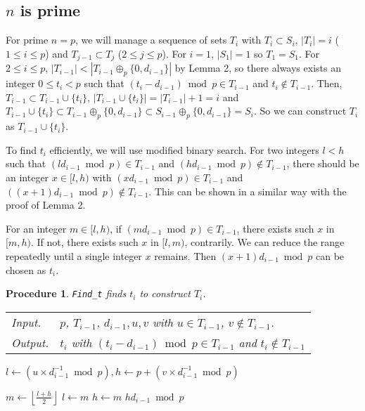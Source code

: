 \documentclass[11pt]{article}
\newtheorem{procedure}{Procedure}
\begin{document}
\subsection{$n$ is prime}

For prime $n = p$, we will manage a sequence of sets $T_i$ with $T_i \subset S_i$, $|T_i| = i$ ($1 \le i \le p$) and $T_{j-1} \subset T_j$ ($2 \le j \le p$). For $i=1$, $|S_1|=1$ so $T_1=S_1$. For $2 \le i \le p$, $|T_{i-1}| < |T_{i-1} \oplus_p \{0, d_{i-1}\}|$ by Lemma 2, so there always exists an integer $0 \le t_i < p$ such that $(t_i - d_{i-1}) \bmod p \in T_{i-1}$ and $t_i \not \in T_{i-1}$. Then, $T_{i-1} \subset T_{i-1} \cup \{t_i\}$, $|T_{i-1} \cup \{t_i\}|=|T_{i-1}|+1=i$ and $T_{i-1} \cup \{t_i\} \subset T_{i-1} \oplus_p \{0, d_{i-1}\} \subset S_{i-1} \oplus_p \{0, d_{i-1}\} = S_i$. So we can construct $T_i$ as $T_{i-1} \cup \{t_i\}$.

To find $t_i$ efficiently, we will use modified binary search. For two integers $l < h$ such that $(ld_{i-1} \bmod p) \in T_{i-1}$ and $(hd_{i-1} \bmod p) \not \in T_{i-1}$, there should be an integer $x \in [l, h)$ with $(xd_{i-1} \bmod p) \in T_{i-1}$ and $((x+1)d_{i-1} \bmod p) \not \in T_{i-1}$. This can be shown in a similar way with the proof of Lemma 2.

For an integer $m \in [l, h)$, if $(md_{i-1} \bmod p) \in T_{i-1}$, there exists such $x$ in $[m, h)$. If not, there exists such $x$ in $[l, m)$, contrarily. We can reduce the range repeatedly until a single integer $x$ remains. Then $(x+1)d_{i-1} \bmod p$ can be chosen as $t_i$.



\begin{procedure} \texttt{Find\_t} finds $t_i$ to construct $T_i$.

\begin{tabular}{ll}
Input. & $p$, $T_{i-1}$, $d_{i-1}, u, v$ with $u \in T_{i-1}$, $v \not\in T_{i-1}$. \\ 

Output. & $t_i$ with $(t_i-d_{i-1}) \bmod p \in T_{i-1}$ and $t_i \not \in T_{i-1}$  \\
\end{tabular}

\end{procedure}

\begin{algorithmic}[1]


\State $l \gets (u \times d_{i-1}^{-1} \bmod p), h \gets p + (v \times d_{i-1}^{-1} \bmod p)$

    \State $m \gets \left\lfloor \frac{l+h}{2} \right\rfloor$
        \State $l \gets m$
    \Else 
        \State $h \gets m$
    \EndIf
\EndWhile
\State \Return $h d_{i-1} \bmod p$
\EndFunction

\end{algorithmic}
\end{document}
